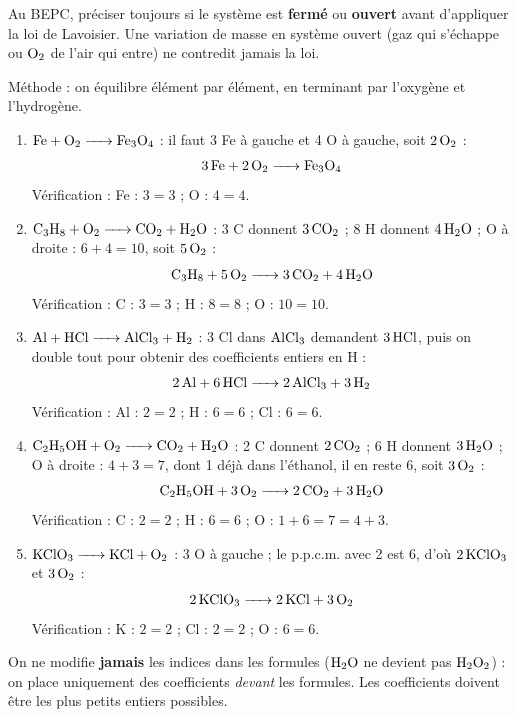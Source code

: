 \documentclass[11pt]{article}
\begin{document}
\begin{attention}
Au BEPC, préciser toujours si le système est \textbf{fermé} ou \textbf{ouvert} avant d'appliquer la loi de Lavoisier. Une variation de masse en système ouvert (gaz qui s'échappe ou $\ce{O2}$ de l'air qui entre) ne contredit jamais la loi.
\end{attention}

\begin{corrige}
Méthode : on équilibre élément par élément, en terminant par l'oxygène et l'hydrogène.
\begin{enumerate}
    \item $\ce{Fe + O2 -> Fe3O4}$ : il faut 3 Fe à gauche et 4 O à gauche, soit $2\,\ce{O2}$ :
    \[ \ce{3Fe + 2O2 -> Fe3O4} \]
    Vérification : Fe : $3 = 3$ ; O : $4 = 4$.
    \item $\ce{C3H8 + O2 -> CO2 + H2O}$ : 3 C donnent $3\,\ce{CO2}$ ; 8 H donnent $4\,\ce{H2O}$ ; O à droite : $6 + 4 = 10$, soit $5\,\ce{O2}$ :
    \[ \ce{C3H8 + 5O2 -> 3CO2 + 4H2O} \]
    Vérification : C : $3 = 3$ ; H : $8 = 8$ ; O : $10 = 10$.
    \item $\ce{Al + HCl -> AlCl3 + H2}$ : 3 Cl dans $\ce{AlCl3}$ demandent $3\,\ce{HCl}$, puis on double tout pour obtenir des coefficients entiers en H :
    \[ \ce{2Al + 6HCl -> 2AlCl3 + 3H2} \]
    Vérification : Al : $2 = 2$ ; H : $6 = 6$ ; Cl : $6 = 6$.
    \item $\ce{C2H5OH + O2 -> CO2 + H2O}$ : 2 C donnent $2\,\ce{CO2}$ ; 6 H donnent $3\,\ce{H2O}$ ; O à droite : $4 + 3 = 7$, dont 1 déjà dans l'éthanol, il en reste 6, soit $3\,\ce{O2}$ :
    \[ \ce{C2H5OH + 3O2 -> 2CO2 + 3H2O} \]
    Vérification : C : $2 = 2$ ; H : $6 = 6$ ; O : $1 + 6 = 7 = 4 + 3$.
    \item $\ce{KClO3 -> KCl + O2}$ : 3 O à gauche ; le p.p.c.m. avec 2 est 6, d'où $2\,\ce{KClO3}$ et $3\,\ce{O2}$ :
    \[ \ce{2KClO3 -> 2KCl + 3O2} \]
    Vérification : K : $2 = 2$ ; Cl : $2 = 2$ ; O : $6 = 6$.
\end{enumerate}
\end{corrige}

\begin{attention}
On ne modifie \textbf{jamais} les indices dans les formules ($\ce{H2O}$ ne devient pas $\ce{H2O2}$) : on place uniquement des coefficients \emph{devant} les formules. Les coefficients doivent être les plus petits entiers possibles.
\end{attention}
\end{document}

